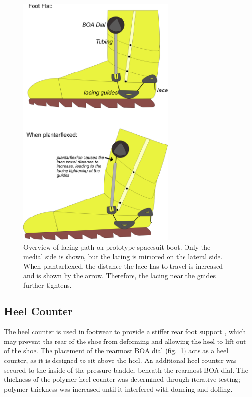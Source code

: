 \documentclass[defaultstyle,11pt]{comps}
\begin{document}
\begin{figure}
\hypertarget{fig:SA3-lacingoverview}{%
\centering
\includegraphics[width=0.7\textwidth,height=\textheight]{../fig/SA3/LacingOverview.png}
\caption{Overview of lacing path on prototype spacesuit boot. Only the medial side is shown, but the lacing is mirrored on the lateral side. When plantarflexed, the distance the lace has to travel is increased and is shown by the arrow. Therefore, the lacing near the guides further tightens.}\label{fig:SA3-lacingoverview}
}
\end{figure}

\hypertarget{heel-counter}{%
\subsection{Heel Counter}\label{heel-counter}}

The heel counter is used in footwear to provide a stiffer rear foot support \citep{Van1995}, which may prevent the rear of the shoe from deforming and allowing the heel to lift out of the shoe.
The placement of the rearmost BOA dial (fig.~\ref{fig:SA3-lacingoverview}) acts as a heel counter, as it is designed to sit above the heel.
An additional heel counter was secured to the inside of the pressure bladder beneath the rearmost BOA dial.
The thickness of the polymer heel counter was determined through iterative testing; polymer thickness was increased until it interfered with donning and doffing.
\end{document}
